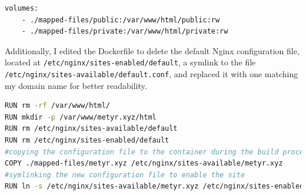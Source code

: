\documentclass[a4paper]{article}
\begin{document}
\begin{lstlisting}[language=bash]
volumes:
    - ./mapped-files/public:/var/www/html/public:rw
    - ./mapped-files/private:/var/www/html/private:rw
\end{lstlisting}
Additionally, I edited the Dockerfile to delete the default Nginx configuration file, located at \texttt{/etc/nginx/sites-enabled/default}, a symlink to the file \texttt{/etc/nginx/sites-available/default.conf}, and replaced it with one matching my domain name for better readability.\newpage
\begin{lstlisting}[language=bash]
RUN rm -rf /var/www/html/
RUN mkdir -p /var/www/metyr.xyz/html
RUN rm /etc/nginx/sites-available/default
RUN rm /etc/nginx/sites-enabled/default
#copying the configuration file to the container during the build process
COPY ./mapped-files/metyr.xyz /etc/nginx/sites-available/metyr.xyz
#symlinking the new configuration file to enable the site
RUN ln -s /etc/nginx/sites-available/metyr.xyz /etc/nginx/sites-enabled/metyr.xyz
\end{lstlisting}
\end{document}
